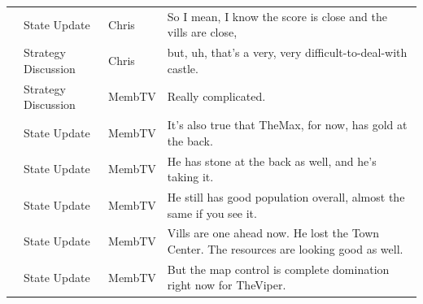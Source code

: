 {\begin{longtable}{@{}>{\theAppRow}r|L{2.3cm}L{1.0cm}U{11.55cm}@{}}
    & State Update          & Chris        & So I mean, I know the score is close and the vills are close,                                                                                                                                                                                                    \\
    & Strategy Discussion   & Chris        & but, uh, that's a very, very difficult-to-deal-with castle.                                                                                                                                                                                                      \\
    & Strategy Discussion   & MembTV       & Really complicated.                                                                                                                                                                                                                                              \\
    & State Update          & MembTV       & It's also true that TheMax, for now, has gold at the back.                                                                                                                                                                                                       \\
    & State Update          & MembTV       & He has stone at the back as well, and he's taking it.                                                                                                                                                                                                            \\
    & State Update          & MembTV       & He still has good population overall, almost the same if you see it.                                                                                                                                                                                             \\
    & State Update          & MembTV       & Vills are one ahead now. He lost the Town Center. The resources are looking good as well.                                                                                                                                                                        \\
    & State Update          & MembTV       & But the map control is complete domination right now for TheViper.                                                                                                                                                                                               \\

\end{longtable}}
